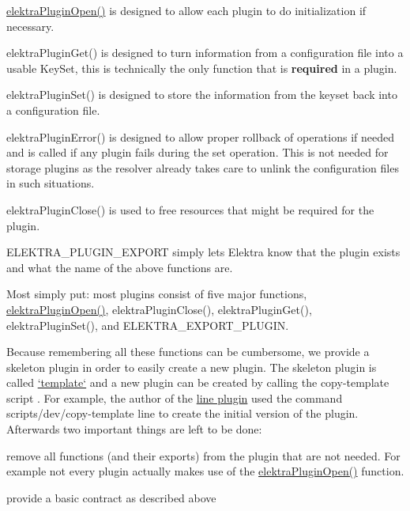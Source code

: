 \begin{DoxyItemize}
\item {\ttfamily \hyperlink{elektra_2plugin_8c_a32a70a7876542c51d153164ac5108a57}{elektra\+Plugin\+Open()}} is designed to allow each plugin to do initialization if necessary.
\item {\ttfamily elektra\+Plugin\+Get()} is designed to turn information from a configuration file into a usable {\ttfamily Key\+Set}, this is technically the only function that is {\bfseries required} in a plugin.
\item {\ttfamily elektra\+Plugin\+Set()} is designed to store the information from the keyset back into a configuration file.
\item {\ttfamily elektra\+Plugin\+Error()} is designed to allow proper rollback of operations if needed and is called if any plugin fails during the set operation. This is not needed for storage plugins as the resolver already takes care to unlink the configuration files in such situations.
\item {\ttfamily elektra\+Plugin\+Close()} is used to free resources that might be required for the plugin.
\item {\ttfamily E\+L\+E\+K\+T\+R\+A\+\_\+\+P\+L\+U\+G\+I\+N\+\_\+\+E\+X\+P\+O\+RT} simply lets Elektra know that the plugin exists and what the name of the above functions are.
\end{DoxyItemize}

Most simply put\+: most plugins consist of five major functions, {\ttfamily \hyperlink{elektra_2plugin_8c_a32a70a7876542c51d153164ac5108a57}{elektra\+Plugin\+Open()}}, {\ttfamily elektra\+Plugin\+Close()}, {\ttfamily elektra\+Plugin\+Get()}, {\ttfamily elektra\+Plugin\+Set()}, and {\ttfamily E\+L\+E\+K\+T\+R\+A\+\_\+\+E\+X\+P\+O\+R\+T\+\_\+\+P\+L\+U\+G\+IN}.

Because remembering all these functions can be cumbersome, we provide a skeleton plugin in order to easily create a new plugin. The skeleton plugin is called \hyperlink{autotoc_md634_src_plugins_template_README_md}{`template`} and a new plugin can be created by calling the copy-\/template script . For example, the author of the \hyperlink{autotoc_md346_src_plugins_line_README_md}{line plugin} used the command {\ttfamily scripts/dev/copy-\/template line} to create the initial version of the plugin. Afterwards two important things are left to be done\+:


\begin{DoxyItemize}
\item remove all functions (and their exports) from the plugin that are not needed. For example not every plugin actually makes use of the {\ttfamily \hyperlink{elektra_2plugin_8c_a32a70a7876542c51d153164ac5108a57}{elektra\+Plugin\+Open()}} function.
\item provide a basic contract as described above
\end{DoxyItemize}

